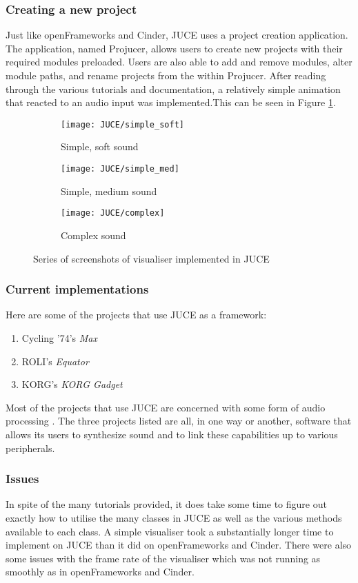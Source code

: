 \documentclass[../../initial_thesis.tex]{subfiles}
\begin{document}
\subsubsection{Creating a new project}
Just like openFrameworks and Cinder, JUCE uses a project creation application. The application, named Projucer, allows users to create new projects with their required modules preloaded. Users are also able to add and remove modules, alter module paths, and rename projects from the within Projucer. After reading through the various tutorials and documentation, a relatively simple animation that reacted to an audio input was implemented.\footnotemark This can be seen in Figure \ref{fig:JUCEVisualiser}.

\begin{figure}
  \begin{subfigure}{0.5\textwidth}
    \centering
    \texttt{[image: JUCE/simple\_soft]}
    \caption{Simple, soft sound}
  \end{subfigure}
  \begin{subfigure}{0.5\textwidth}
    \centering
    \texttt{[image: JUCE/simple\_med]}
    \caption{Simple, medium sound}
  \end{subfigure}
  \begin{subfigure}{0.5\textwidth}
    \centering
    \texttt{[image: JUCE/complex]}
    \caption{Complex sound}
  \end{subfigure}
  \caption{Series of screenshots of visualiser implemented in JUCE}
  \label{fig:JUCEVisualiser}
\end{figure}

\subsubsection{Current implementations}
Here are some of the projects that use JUCE as a framework:
\begin{enumerate}
\item Cycling '74's \textit{Max}
\item ROLI's \textit{Equator}
\item KORG's \textit{KORG Gadget}
\end{enumerate}
Most of the projects that use JUCE are concerned with some form of audio processing \cite{JUCE}. The three projects listed are all, in one way or another, software that allows its users to synthesize sound and to link these capabilities up to various peripherals.

\subsubsection{Issues}
In spite of the many tutorials provided, it does take some time to figure out exactly how to utilise the many classes in JUCE as well as the various methods available to each class. A simple visualiser took a substantially longer time to implement on JUCE than it did on openFrameworks and Cinder. There were also some issues with the frame rate of the visualiser which was not running as smoothly as in openFrameworks and Cinder.
\end{document}
